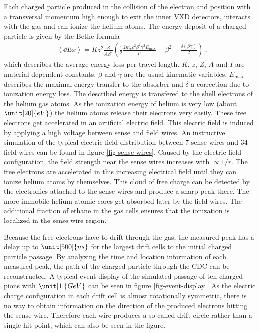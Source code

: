 Each charged particle produced in the collision of the electron and position with a transversal momentum high enough to exit the inner VXD detectors, interacts with the gas and can ionize the helium atoms. The energy deposit of a charged particle is given by the Bethe formula \cite{bethe}
\begin{align}
 - \left\langle \dd{E}{x} \right\rangle = K z^2 \frac{Z}{A \beta^2} \left( \frac 1 2 \frac{2 m_e c^2 \beta^2 \gamma^2 E_\text{max}}{I^2} - \beta^2 - \frac{\delta(\beta \gamma)}{2}  \right) \ , \label{form-bethe}
\end{align}
which describes the average energy loss per travel length. $K$, $z$, $Z$, $A$ and $I$ are material dependent constants, $\beta$ and $\gamma$ are the usual kinematic variables. $E_\text{max}$ describes the maximal energy transfer to the absorber and $\delta$ a correction due to ionization energy loss. The described energy is transfered to the shell electrons of the helium gas atoms. As the ionization energy of helium is very low (about $\unit[20]{eV}$) the helium atoms release their electrons very easily. These free electrons get accelerated in an artificial electric field. This electric field is induced by applying a high voltage between sense and field wires. An instructive simulation of the typical electric field distribution between 7 sense wires and 34 field wires can be found in figure \ref{fig-sense-wires}. Caused by the electric field configuration, the field strength near the sense wires increases with $\propto 1/r$. The free electrons are accelerated in this increasing  electrical field until they can ionize helium atoms by themselves. This cloud of free charge can be detected by the electronics attached to the sense wires and produce a sharp peak there. The more immobile helium atomic cores get absorbed later by the field wires. The additional fraction of ethane in the gas cells ensures that the ionization is localized in the sense wire region.

Because the free electrons have to drift through the gas, the measured peak has a delay up to $\unit[500]{ns}$ for the largest drift cells to the initial charged particle passage. By analyzing the time and location information of each measured peak, the path of the charged particle through the CDC can be reconstructed. A typical event display of the simulated passage of ten charged pions with $\unit[1]{GeV}$ can be seen in figure \ref{fig-event-display}. As the electric charge configuration in each drift cell is almost rotationally symmetric, there is no way to obtain information on the direction of the produced electrons hitting the sense wire. Therefore each wire produces a so called drift circle rather than a single hit point, which can also be seen in the figure.

